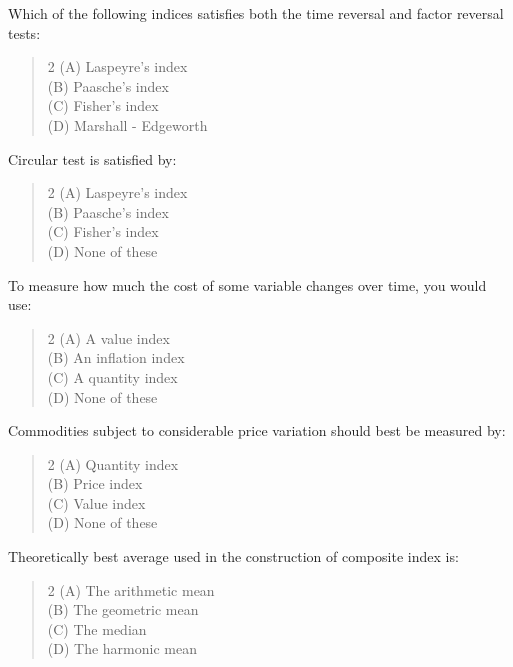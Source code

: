 \documentclass[11pt,a4paper]{article}
\begin{document}
\begin{mcqlist}
\item Which of the following indices satisfies both the time reversal and factor reversal tests:
\begin{quote}\begin{multicols}{2}
\noindent (A) Laspeyre's index \\
(B) Paasche's index \\
(C) Fisher's index \\
(D) Marshall - Edgeworth
\end{multicols}\end{quote}

\item Circular test is satisfied by:
\begin{quote}\begin{multicols}{2}
\noindent (A) Laspeyre's index \\
(B) Paasche's index \\
(C) Fisher's index \\
(D) None of these
\end{multicols}\end{quote}

\item To measure how much the cost of some variable changes over time, you would use:
\begin{quote}\begin{multicols}{2}
\noindent (A) A value index \\
(B) An inflation index \\
(C) A quantity index \\
(D) None of these
\end{multicols}\end{quote}

\item Commodities subject to considerable price variation should best be measured by:
\begin{quote}\begin{multicols}{2}
\noindent (A) Quantity index \\
(B) Price index \\
(C) Value index \\
(D) None of these
\end{multicols}\end{quote}

\item Theoretically best average used in the construction of composite index is:
\begin{quote}\begin{multicols}{2}
\noindent (A) The arithmetic mean \\
(B) The geometric mean \\
(C) The median \\
(D) The harmonic mean
\end{multicols}\end{quote}


\end{mcqlist}
\end{document}
